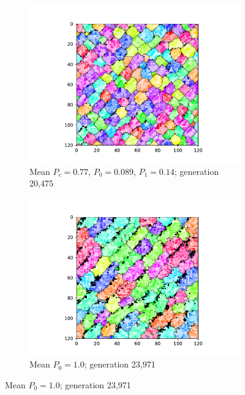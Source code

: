 \begin{figure}[!htbp]
\begin{center}
\begin{subfigure}[b]{0.82\columnwidth}
  \includegraphics[width=\columnwidth,trim={2.5cm 0.5cm 2.5cm 1cm},clip]{img/ChannelMap_1022_update19500000}
  \caption{Mean $P_{c} = 0.77$, $P_0 = 0.089$, $P_1 = 0.14$; generation 20,475}
  \label{fig:ChannelMap_1022}
\end{subfigure}

\begin{subfigure}[b]{0.82\columnwidth}
  \includegraphics[width=\columnwidth,trim={2.5cm 0.5cm 2.5cm 1cm},clip]{img/ChannelMap_1041_update19500000}
  \caption{Mean $P_0 = 1.0$; generation 23,971}
  \label{fig:ChannelMap_1041}
\end{subfigure}


\end{center}
\end{figure}
